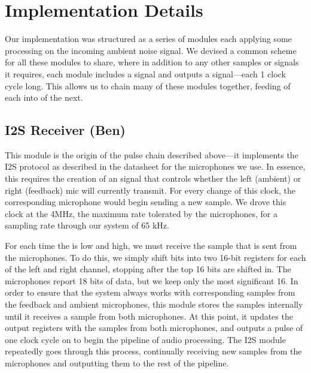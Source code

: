 \documentclass{fpgairpods}
\begin{document}
\section{Implementation Details}
Our implementation was structured as a series of modules each applying some processing on the incoming ambient noise signal. We devised a common scheme for all these modules to share, where in addition to any other samples or signals it requires, each module includes a  signal and outputs a  signal---each 1 clock cycle long. This allows us to chain many of these modules together, feeding  of each into  of the next.

\subsection{I2S Receiver (Ben)}
This module is the origin of the  pulse chain described above---it implements the I2S protocol as described in the datasheet\cite{mic_datasheet} for the microphones we use. In essence, this requires the creation of an  signal that controls whether the left (ambient) or right (feedback) mic will currently transmit. For every change of this clock, the corresponding microphone would begin sending a new sample. We drove this clock at the 4MHz, the maximum rate tolerated by the microphones, for a sampling rate through our system of 65 kHz.

For each time the  is low and high, we must receive the sample that is sent from the microphones. To do this, we simply shift bits into two 16-bit registers for each of the left and right channel, stopping after the top 16 bits are shifted in. The microphones report 18 bits of data, but we keep only the most significant 16. In order to ensure that the system always works with corresponding samples from the feedback and ambient microphones, this module stores the samples internally until it receives a sample from both microphones. At this point, it updates the output registers with the samples from both microphones, and outputs a pulse of one clock cycle on  to begin the pipeline of audio processing. The I2S module repeatedly goes through this process, continually receiving new samples from the microphones and outputting them to the rest of the pipeline.
\end{document}
